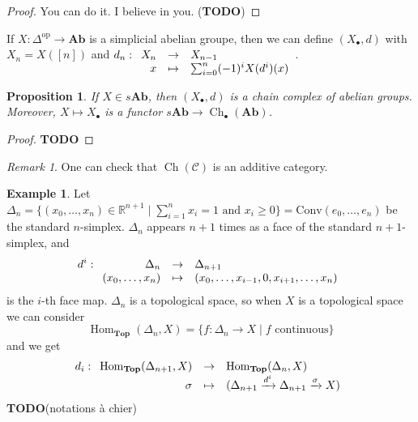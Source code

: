 \documentclass{article}
\newcommand{\op}{\mathrm{op}}
\newcommand{\R}{\mathbb{R}}
\newcommand{\cat}{\mathcal{C}}
\newcommand{\Top}{\mathbf{Top}}
\newcommand{\Ab}{\mathbf{Ab}}
\DeclareMathOperator{\Ch}{Ch}
\DeclareMathOperator{\Hom}{Hom}
\newcommand{\todo}{\textbf{TODO}}
\newcommand{\applic}[4]{\begin{array}[t]{rcl}
#1 & \to & #2 \\
#3 & \mapsto & #4
\end{array}}
\theoremstyle{plain}
\newtheorem{proposition}[theorem]{Proposition}
\theoremstyle{definition}
\newtheorem{example}[theorem]{Example}
\theoremstyle{remark}
\newtheorem*{remark}{Remark}
\begin{document}
\begin{proof}
    You can do it. I believe in you. (\todo)
\end{proof}

If $X : \Delta^\op \to \Ab$ is a simplicial abelian groupe, then we can define $(X_\bullet,d)$ with $X_n = X([n])$ and $d_n : \applic{X_n}{X_{n-1}}{x}{\sum_{i=0}^n (-1)^i X(d^i)(x)}$.
\begin{proposition}
    If $X \in s\Ab$, then $(X_\bullet,d)$ is a chain complex of abelian groups. Moreover, $X \mapsto X_\bullet$ is a functor $s\Ab \to \Ch_\bullet (\Ab)$.
\end{proposition}

\begin{proof}
    \todo
\end{proof}

\begin{remark}
    One can check that $\Ch(\cat)$ is an additive category.
\end{remark}

\begin{example}
    Let $\Delta_n = \{(x_0,\dots,x_n) \in \R^{n+1} \mid \sum\limits_{i=1}^n x_i = 1 \text{ and } x_i \ge 0\} = \mathrm{Conv}(e_0,\dots,e_n)$ be the standard $n$-simplex. $\Delta_n$ appears $n+1$ times as a face of the standard $n+1$-simplex, and
    \[d^i : \applic{\Delta_n}{\Delta_{n+1}}{(x_0,\dots,x_n)}{(x_0,\dots,x_{i-1},0,x_{i+1},\dots,x_n)}\]
    is the $i$-th face map. $\Delta_n$ is a topological space, so when $X$ is a topological space we can consider
    \[\Hom_\Top (\Delta_n,X) = \{f : \Delta_n \to X \mid f \text{ continuous}\}\]
    and we get
    \[d_i : \applic{\Hom_\Top(\Delta_{n+1},X)}{\Hom_\Top(\Delta_n,X)}{\sigma}{(\Delta_{n+1} \xrightarrow{d^i} \Delta_{n+1} \xrightarrow{\sigma} X)}\]
    \todo (notations à chier)
\end{example}
\end{document}
